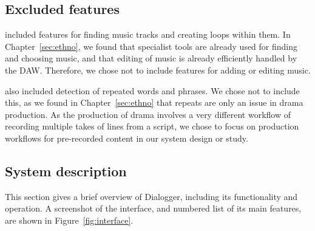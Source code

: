 \subsection{Excluded features}


\citet{Rubin2013} included features for finding music tracks and creating loops within them.  In
Chapter~\ref{sec:ethno}, we found that specialist tools are already used for finding and choosing music, and that
editing of music is already efficiently handled by the DAW. Therefore, we chose not to include features for adding or
editing music. 

\citet{Rubin2013} also included detection of repeated words and phrases. We chose not to include this, as we found in
Chapter~\ref{sec:ethno} that repeats are only an issue in drama production. As the production of drama involves a very
different workflow of recording multiple takes of lines from a script, we chose to focus on production workflows for
pre-recorded content in our system design or study.


\subsection{System description}

This section gives a brief overview of Dialogger, including its functionality and operation.  A screenshot of the
interface, and numbered list of its main features, are shown in Figure~\ref{fig:interface}.

